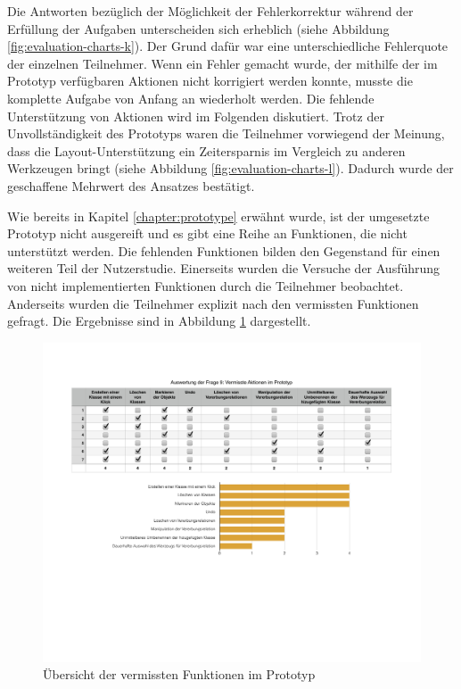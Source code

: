 Die Antworten bezüglich der Möglichkeit der Fehlerkorrektur während der Erfüllung der Aufgaben unterscheiden sich erheblich (siehe Abbildung \ref{fig:evaluation-charts-k}). Der Grund dafür war eine unterschiedliche Fehlerquote der einzelnen Teilnehmer. Wenn ein Fehler gemacht wurde, der mithilfe der im Prototyp verfügbaren Aktionen nicht korrigiert werden konnte, musste die komplette Aufgabe von Anfang an wiederholt werden. Die fehlende Unterstützung von Aktionen wird im Folgenden diskutiert. Trotz der Unvollständigkeit des Prototyps waren die Teilnehmer vorwiegend der Meinung, dass die Layout-Unterstützung ein Zeitersparnis im Vergleich zu anderen Werkzeugen bringt (siehe Abbildung \ref{fig:evaluation-charts-l}). Dadurch wurde der geschaffene Mehrwert des Ansatzes bestätigt.

Wie bereits in Kapitel \ref{chapter:prototype} erwähnt wurde, ist der umgesetzte Prototyp nicht ausgereift und es gibt eine Reihe an Funktionen, die nicht unterstützt werden. Die fehlenden Funktionen bilden den Gegenstand für einen weiteren Teil der Nutzerstudie. Einerseits wurden die Versuche der Ausführung von nicht implementierten Funktionen durch die Teilnehmer beobachtet. Anderseits wurden die Teilnehmer explizit nach den vermissten Funktionen gefragt. Die Ergebnisse sind in Abbildung \ref{fig:missed-prototype-functions} dargestellt.

\begin{figure}[hbt]
    \centering
    \includegraphics[width=\textwidth]{assets/missed-prototype-functions}
    \caption{Übersicht der vermissten Funktionen im Prototyp}
    \label{fig:missed-prototype-functions}
\end{figure}


